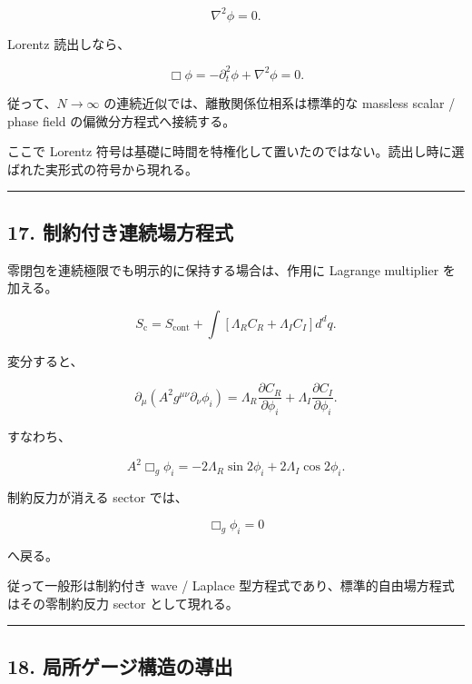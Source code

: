 \documentclass[
  a4paper,
]{ltjsarticle}
\begin{document}
\[
\boxed{
\nabla^2\phi=0.
}
\tag{61}
\]

Lorentz 読出しなら、

\[
\boxed{
\Box\phi
=
-\partial_t^2\phi
+
\nabla^2\phi
=
0.
}
\tag{62}
\]

従って、\(N\to\infty\) の連続近似では、離散関係位相系は標準的な massless
scalar / phase field の偏微分方程式へ接続する。

ここで Lorentz
符号は基礎に時間を特権化して置いたのではない。読出し時に選ばれた実形式の符号から現れる。

\begin{center}\rule{0.5\linewidth}{0.5pt}\end{center}

\subsection{17.
制約付き連続場方程式}\label{ux5236ux7d04ux4ed8ux304dux9023ux7d9aux5834ux65b9ux7a0bux5f0f}

零閉包を連続極限でも明示的に保持する場合は、作用に Lagrange multiplier
を加える。

\[
\boxed{
S_{\mathrm{c}}
=
S_{\mathrm{cont}}
+
\int
\left[
\Lambda_R C_R
+
\Lambda_I C_I
\right]
d^dq.
}
\tag{63}
\]

変分すると、

\[
\boxed{
\partial_\mu
\left(
A^2g^{\mu\nu}\partial_\nu\phi_i
\right)
=
\Lambda_R
\frac{\partial C_R}{\partial\phi_i}
+
\Lambda_I
\frac{\partial C_I}{\partial\phi_i}.
}
\tag{64}
\]

すなわち、

\[
\boxed{
A^2\Box_g\phi_i
=
-2\Lambda_R\sin2\phi_i
+
2\Lambda_I\cos2\phi_i.
}
\tag{65}
\]

制約反力が消える sector では、

\[
\boxed{
\Box_g\phi_i=0
}
\tag{66}
\]

へ戻る。

従って一般形は制約付き wave / Laplace
型方程式であり、標準的自由場方程式はその零制約反力 sector として現れる。

\begin{center}\rule{0.5\linewidth}{0.5pt}\end{center}

\subsection{18.
局所ゲージ構造の導出}\label{ux5c40ux6240ux30b2ux30fcux30b8ux69cbux9020ux306eux5c0eux51fa}
\end{document}
